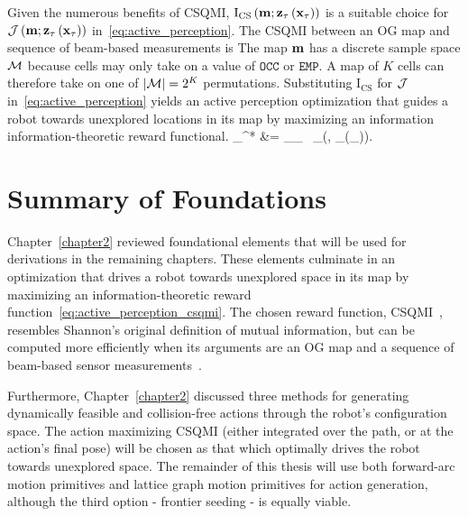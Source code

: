 Given the numerous benefits of CSQMI, $\text{I}_{\text{CS}}\left(\mathbf{m};\mathbf{z}_{\mathbf{\tau}}\left(\mathbf{x}_{\mathbf{\tau}}\right)\right)$
is a suitable choice
for $\mathcal{J}\left(\mathbf{m}; \mathbf{z}_{\mathbf{\tau}}\left(\mathbf{x}_{\mathbf{\tau}}\right)\right)$
in~\eqref{eq:active_perception}. The CSQMI between an OG map and sequence of
beam-based measurements is
%
%
The map $\mathbf{m}$ has a discrete sample space $\mathcal{M}$ because cells may
only take on a value of $\texttt{OCC}$ or $\texttt{EMP}$. A map of $K$ cells
can therefore take on one of $\vert \mathcal{M} \vert = 2^{K}$ permutations.
Substituting $\text{I}_{\text{CS}}$ for $\mathcal{J}$ in~\eqref{eq:active_perception}
yields an active perception optimization that guides a robot towards unexplored
locations in its map by maximizing an information information-theoretic reward functional.
%
\eq
{
 _{\mbf{\tau}}^{*}
 &=
 \argmax_{_{\mbf{\tau}} \in {}}
 \
 _{}\left(,
 _{\mbf{\tau}}(_{\mbf{\tau}})\right).
 \label{eq:active_perception_csqmi}
}

\section{Summary of Foundations}

Chapter~\ref{chapter2} reviewed foundational elements that will be used for
derivations in the remaining chapters. These elements culminate in an
optimization that drives a robot towards unexplored space in its map by
maximizing an information-theoretic reward
function~\eqref{eq:active_perception_csqmi}. The chosen reward function,
CSQMI~\cite{principe2010information},
resembles Shannon's original definition of mutual information, but can be computed
more efficiently when its arguments are an OG map and a sequence
of beam-based sensor measurements~\cite{charrow2015icra}.

Furthermore, Chapter~\ref{chapter2} discussed three methods for generating
dynamically feasible and collision-free actions through the robot's
configuration space. The action maximizing CSQMI (either integrated over the
path, or at the action's final pose) will be chosen as that which optimally
drives the robot towards unexplored space. The remainder of this thesis will use both forward-arc
motion primitives and lattice graph motion primitives for action generation,
although the third option - frontier seeding - is equally viable.
